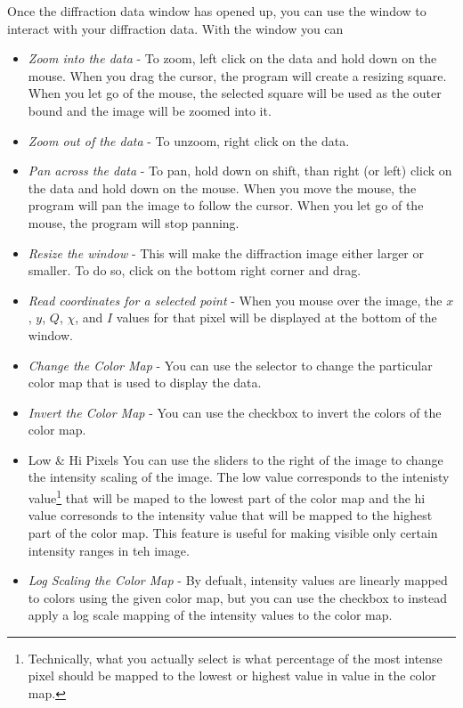 Once the diffraction data window has opened up, you can use
the window to interact with your diffraction data. With
the window you can
\begin{itemize}
    \item {\em Zoom into the data} - To zoom, left click on
    the data and hold down on the mouse. When you drag the cursor, 
    the program will create a resizing square. When you let go of the
    mouse, the selected square will be used as the outer bound and
    the image will be zoomed into it.
    \item {\em Zoom out of the data} - To unzoom, right click on
    the data.
    \item {\em Pan across the data} - To pan, hold down on shift, than
    right (or left) click on the data and hold down on the mouse. When 
    you move the mouse, the program will pan the image to follow the 
    cursor. When you let go of the mouse, the program will stop panning.
    \item {\em Resize the window} - This will make the diffraction
    image either larger or smaller. To do so, click on the bottom 
    right corner and drag.
    \item {\em Read coordinates for a selected point} - When you
    mouse over the image, the $x$, $y$, $Q$, $\chi$, and $I$
    values for that pixel will be displayed at the bottom of the
    window.
    \item {\em Change the Color Map} - You can use the 
     selector to change the particular color map that 
    is used to display the data.
    \item {\em Invert the Color Map} - You can use the 
     checkbox to invert the colors of the color map.
    \item {Low \& Hi Pixels} You can use the sliders to the
    right of the image to change the intensity scaling of the
    image. The low value corresponds to the intenisty 
    value\footnote{Technically, what you actually select is what
    percentage of the most intense pixel should be mapped to
    the lowest or highest value in value in the color map.}
    that will be maped to the lowest part of
    the color map and the hi value corresonds to the intensity
    value that will be mapped to the highest part of the color
    map. This feature is useful for making visible only certain
    intensity ranges in teh image.
    \item {\em Log Scaling the Color Map} - By defualt, intensity
    values are linearly mapped to colors using the given color
    map, but you can use the  checkbox to instead
    apply a log scale mapping of the intensity values to the color
    map.
\end{itemize}


